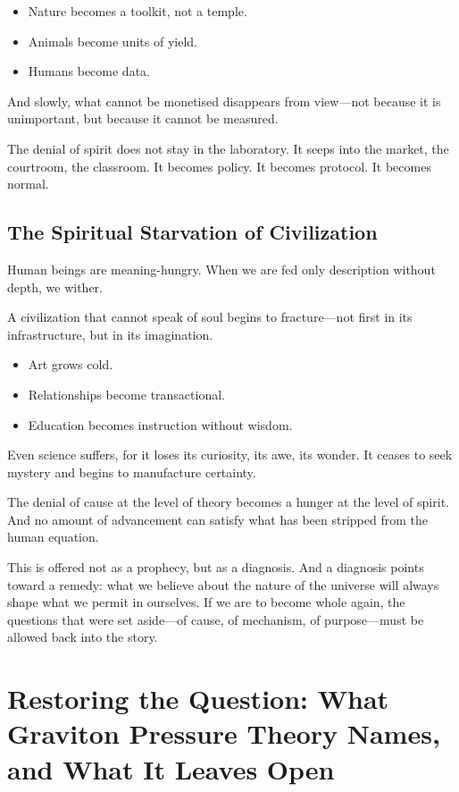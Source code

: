 \documentclass[11pt,a4paper]{article}
\begin{document}
\begin{itemize}
  \item Nature becomes a toolkit, not a temple.
  \item Animals become units of yield.
  \item Humans become data.
\end{itemize}

And slowly, what cannot be monetised disappears from view---not because it is unimportant, but because it cannot be measured.

The denial of spirit does not stay in the laboratory. It seeps into the market, the courtroom, the classroom. It becomes policy. It becomes protocol. It becomes normal.

\subsection{The Spiritual Starvation of Civilization}

Human beings are meaning-hungry. When we are fed only description without depth, we wither.

A civilization that cannot speak of soul begins to fracture---not first in its infrastructure, but in its imagination.

\begin{itemize}
  \item Art grows cold.
  \item Relationships become transactional.
  \item Education becomes instruction without wisdom.
\end{itemize}

Even science suffers, for it loses its curiosity, its awe, its wonder. It ceases to seek mystery and begins to manufacture certainty.

The denial of cause at the level of theory becomes a hunger at the level of spirit. And no amount of advancement can satisfy what has been stripped from the human equation.

This is offered not as a prophecy, but as a diagnosis. And a diagnosis points toward a remedy: what we believe about the nature of the universe will always shape what we permit in ourselves. If we are to become whole again, the questions that were set aside---of cause, of mechanism, of purpose---must be allowed back into the story.

\section{Restoring the Question: What Graviton Pressure Theory Names, and What It Leaves Open}
\end{document}
